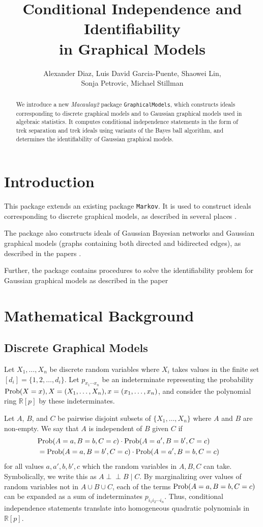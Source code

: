 \documentclass[10pt]{article}
\title{Conditional Independence and Identifiability\\ in Graphical Models}
\author{Alexander Diaz, Luis David Garcia-Puente, Shaowei Lin, \\Sonja Petrovic, Michael Stillman}
\date{}
\theoremstyle{definition}
\newcommand{\R}{\mathbb{R}}
\newcommand{\Prob}{{\rm Prob}}
\def\ci{\perp\!\!\!\perp}
\begin{document}
\maketitle
\begin{abstract}
We introduce a new {\it Macaulay2} package
{\tt GraphicalModels}, which constructs ideals corresponding to
discrete graphical models and to Gaussian graphical models used in
algebraic statistics. It computes conditional independence statements in the form
of trek separation and trek ideals using variants of the Bayes ball algorithm, and
determines the identifiability of Gaussian graphical models.
\end{abstract}

\section{Introduction}
This package extends an existing package {\tt Markov}. It is used to
construct ideals corresponding to discrete graphical models, as
described in several places \cite{GSS}.

The package also constructs ideals of Gaussian Bayesian networks and
Gaussian graphical models (graphs containing both directed and
bidirected edges), as described in the papers \cite{S,STD}.

Further, the package contains procedures to solve the identifiability
problem for Gaussian graphical models as described in the paper \cite{GPSS}

\section{Mathematical Background}

\subsection{Discrete Graphical Models}
Let $X_1, \ldots, X_n$ be discrete random variables where $X_i$ takes
values in the finite set $[d_i] = \{1, 2, \ldots, d_i\}$. Let $p_{x_1\cdots x_n}$ be an indeterminate representing the
probability $\Prob(X=x), X =(X_1, \ldots, X_n), x=(x_1,\ldots,x_n)$, and consider
the polynomial ring $\R[p]$ by these indeterminates.

Let $A$, $B$, and $C$ be pairwise disjoint subsets of $\{X_1, \ldots, X_n\}$
where $A$ and $B$ are non-empty. We say that $A$ is independent of $B$
given $C$ if 
\begin{eqnarray*}
&\Prob(A =a,B=b,C=c) \cdot \Prob(A=a',B=b',C=c)& \\&= \Prob(A
=a,B=b',C=c) \cdot \Prob(A=a',B=b,C=c)&
\end{eqnarray*}
for all values $a,a',b,b',c$ which the random variables in $A,B,C$ can
take. Symbolically, we write this as $A \ci B \mid C$. By marginalizing
over values of random variables not in $A \cup B \cup C$, each of the
terms $\Prob(A =a,B=b,C=c)$ can be expanded as a sum of indeterminates
$p_{i_1i_2\cdots i_n}$. Thus, conditional independence statements
translate into homogeneous quadratic polynomials in $\R[p]$.
\end{document}
